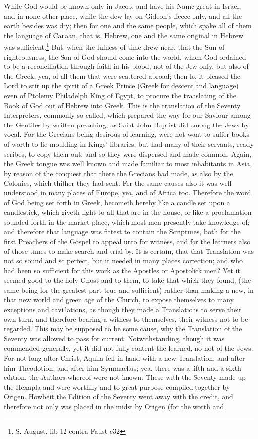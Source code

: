 While God would be known only in Jacob, and have his Name great in Israel, and in none other place, while the dew lay on Gideon's fleece only, and all the earth besides was dry; then for one and the same people, which spake all of them the language of Canaan, that is, Hebrew, one and the same original in Hebrew was sufficient.\footnote{S. August. lib 12 contra Faust c32} But, when the fulness of time drew near, that the Sun of righteousness, the Son of God should come into the world, whom God ordained to be a reconciliation through faith in his blood, not of the Jew only, but also of the Greek, yea, of all them that were scattered abroad; then lo, it pleased the Lord to stir up the spirit of a Greek Prince (Greek for descent and language) even of Ptolemy Philadelph King of Egypt, to procure the translating of the Book of God out of Hebrew into Greek. This is the translation of the Seventy Interpreters, commonly so called, which prepared the way for our Saviour among the Gentiles by written preaching, as Saint John Baptist did among the Jews by vocal. For the Grecians being desirous of learning, were not wont to suffer books of worth to lie moulding in Kings' libraries, but had many of their servants, ready scribes, to copy them out, and so they were dispersed and made common. Again, the Greek tongue was well known and made familiar to most inhabitants in Asia, by reason of the conquest that there the Grecians had made, as also by the Colonies, which thither they had sent. For the same causes also it was well understood in many places of Europe, yea, and of Africa too. Therefore the word of God being set forth in Greek, becometh hereby like a candle set upon a candlestick, which giveth light to all that are in the house, or like a proclamation sounded forth in the market place, which most men presently take knowledge of; and therefore that language was fittest to contain the Scriptures, both for the first Preachers of the Gospel to appeal unto for witness, and for the learners also of those times to make search and trial by. It is certain, that that Translation was not so sound and so perfect, but it needed in many places correction; and who had been so sufficient for this work as the Apostles or Apostolick men? Yet it seemed good to the holy Ghost and to them, to take that which they found, (the same being for the greatest part true and sufficient) rather than making a new, in that new world and green age of the Church, to expose themselves to many exceptions and cavillations, as though they made a Translations to serve their own turn, and therefore bearing a witness to themselves, their witness not to be regarded. This may be supposed to be some cause, why the Translation of the Seventy was allowed to pass for current. Notwithstanding, though it was commended generally, yet it did not fully content the learned, no not of the Jews. For not long after Christ, Aquila fell in hand with a new Translation, and after him Theodotion, and after him Symmachus; yea, there was a fifth and a sixth edition, the Authors whereof were not known. These with the Seventy made up the Hexapla and were worthily and to great purpose compiled together by Origen. Howbeit the Edition of the Seventy went away with the credit, and therefore not only was placed in the midst by Origen (for the worth and 